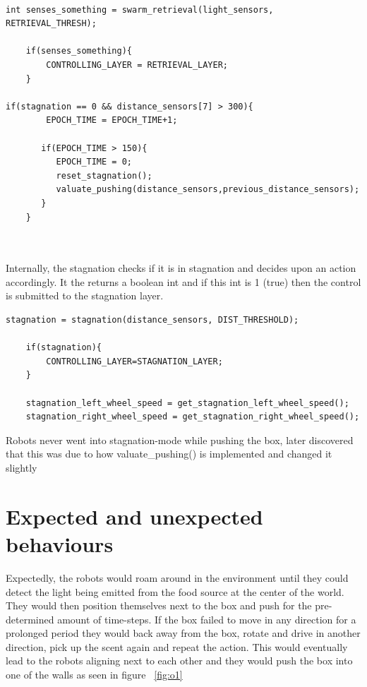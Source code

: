 \documentclass[titlepage,norsk,a4paper,10pt]{article}
\begin{document}
\begin{verbatim}

int senses_something = swarm_retrieval(light_sensors, RETRIEVAL_THRESH);   

    if(senses_something){
        CONTROLLING_LAYER = RETRIEVAL_LAYER;
    }
  
if(stagnation == 0 && distance_sensors[7] > 300){ 
        EPOCH_TIME = EPOCH_TIME+1;

       if(EPOCH_TIME > 150){ 
          EPOCH_TIME = 0;
          reset_stagnation();
          valuate_pushing(distance_sensors,previous_distance_sensors);
       }
    }



\end{verbatim}

Internally, the stagnation checks if it is in stagnation and decides upon an action accordingly. It the returns a boolean int and if this int is 1 (true) then the control is submitted to the stagnation layer.

\begin{verbatim}
stagnation = stagnation(distance_sensors, DIST_THRESHOLD);
	
	if(stagnation){
		CONTROLLING_LAYER=STAGNATION_LAYER;
	}
	
	stagnation_left_wheel_speed = get_stagnation_left_wheel_speed();
	stagnation_right_wheel_speed = get_stagnation_right_wheel_speed();

\end{verbatim}

Robots never went into stagnation-mode while pushing the box, later discovered that this was due to how valuate\_pushing() is implemented and changed it slightly

\section{Expected and unexpected behaviours}

Expectedly, the robots would roam around in the environment until they could detect the light being emitted from the food source at the center of the world. They would then position themselves next to the box and push for the pre-determined amount of time-steps. If the box failed to move in any direction for a prolonged period they would back away from the box, rotate and drive in another direction, pick up the scent again and repeat the action. This would eventually lead to the robots aligning next to each other and they would push the box into one of the walls as seen in figure ~\ref{fig:o1}
\end{document}
